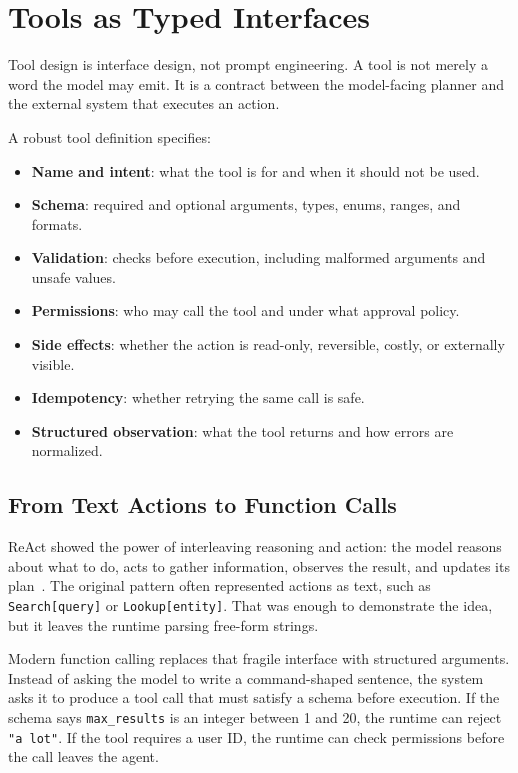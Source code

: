 \section{Tools as Typed Interfaces}
\label{sec:ch21-tools-as-interfaces}

Tool design is interface design, not prompt engineering. A tool is not merely a word the model may emit. It is a contract between the model-facing planner and the external system that executes an action.

A robust tool definition specifies:

\begin{itemize}[nosep]
  \item \textbf{Name and intent}: what the tool is for and when it should not be used.
  \item \textbf{Schema}: required and optional arguments, types, enums, ranges, and formats.
  \item \textbf{Validation}: checks before execution, including malformed arguments and unsafe values.
  \item \textbf{Permissions}: who may call the tool and under what approval policy.
  \item \textbf{Side effects}: whether the action is read-only, reversible, costly, or externally visible.
  \item \textbf{Idempotency}: whether retrying the same call is safe.
  \item \textbf{Structured observation}: what the tool returns and how errors are normalized.
\end{itemize}

\subsection{From Text Actions to Function Calls}

ReAct showed the power of interleaving reasoning and action: the model reasons about what to do, acts to gather information, observes the result, and updates its plan~\cite{yao2023react}. The original pattern often represented actions as text, such as \texttt{Search[query]} or \texttt{Lookup[entity]}. That was enough to demonstrate the idea, but it leaves the runtime parsing free-form strings.

Modern function calling replaces that fragile interface with structured arguments. Instead of asking the model to write a command-shaped sentence, the system asks it to produce a tool call that must satisfy a schema before execution. If the schema says \texttt{max\_results} is an integer between 1 and 20, the runtime can reject \texttt{"a lot"}. If the tool requires a user ID, the runtime can check permissions before the call leaves the agent.

